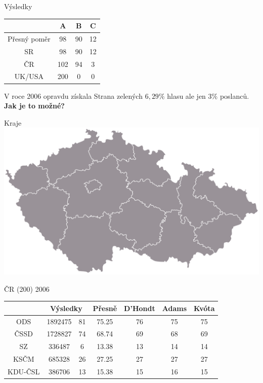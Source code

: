 \documentclass[17pt]{beamer}
\begin{document}
\begin{frame}{Výsledky}
\begin{center}
\begin{tabular}{|c|c|c|c|} \hline
  & A & B & C \\ \hline 
Přesný poměr & 98 & 90 & 12\\ \hline
SR & 98 & 90 & 12\\ \hline
ČR & 102 & 94 & 3\\ \hline
UK/USA & 200 & 0 & 0\\ \hline
\end{tabular}
\end{center} 
V roce 2006 opravdu získala Strana zelených $6{,}29\%$ hlasu ale jen $3\%$ poslanců. 
\textbf{Jak je to možné?}
\end{frame}

\begin{frame}{Kraje}
\includegraphics[scale=0.1]{zdroje/kraje.png}
\end{frame}

\begin{frame}{ČR (200) 2006}
\footnotesize
\begin{tabular}{|c|c|c|c|c|c|c|} \hline
 & \multicolumn{2}{c|}{Výsledky} & Přesně & D'Hondt & Adams & Kvóta\\
\hline ODS & 1892475 & 81 & 75.25 & 76 & 75 & 75\\
\hline ČSSD & 1728827 & 74 & 68.74 & 69 & 68 & 69\\
\hline SZ & 336487 & 6 & 13.38 & 13 & 14 & 14 \\
\hline KSČM & 685328 & 26 & 27.25 & 27 & 27 & 27 \\
\hline KDU-ČSL & 386706 & 13 & 15.38 & 15 & 16 & 15 \\
\hline
\end{tabular}
\end{frame}
\end{document}
